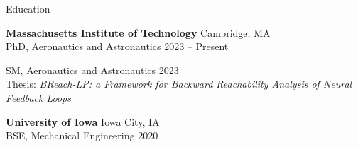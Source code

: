 \begin{rSection}{Education}

{\bf Massachusetts Institute of Technology} \hfill {Cambridge, MA} \\ 
PhD, Aeronautics and Astronautics \hfill {2023 -- Present} 


SM, Aeronautics and Astronautics \hfill {2023} 
\\ 
Thesis: \textit{BReach-LP: a Framework for Backward Reachability Analysis of Neural Feedback Loops}

{\bf University of Iowa} \hfill {Iowa City, IA} \\
BSE, Mechanical Engineering \hfill {2020}



\end{rSection}